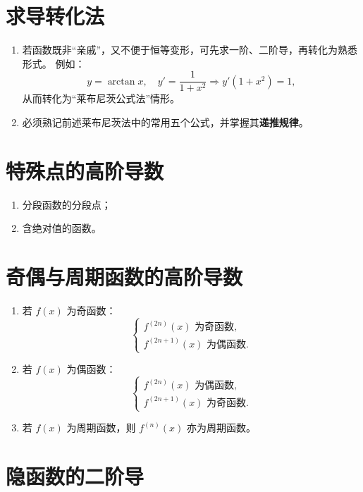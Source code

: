 \section{求导转化法}
\DTwoThree
\begin{enumerate}
    \item 若函数既非“亲戚”，又不便于恒等变形，可先求一阶、二阶导，再转化为熟悉形式。
          例如：
          \[
              y = \arctan x, \quad y' = \frac{1}{1+x^2} \Rightarrow y'(1+x^2)=1,
          \]
          从而转化为“莱布尼茨公式法”情形。

    \item 必须熟记前述莱布尼茨法中的常用五个公式，并掌握其\textbf{递推规律}。
\end{enumerate}

\section{特殊点的高阶导数}
\begin{enumerate}
    \item 分段函数的分段点；
    \item 含绝对值的函数。
\end{enumerate}


\section{奇偶与周期函数的高阶导数}

\begin{enumerate}
    \item 若 $f(x)$ 为奇函数：
          \[
              \begin{cases}
                  f^{(2n)}(x)\text{ 为奇函数}, \\
                  f^{(2n+1)}(x)\text{ 为偶函数}.
              \end{cases}
          \]
    \item 若 $f(x)$ 为偶函数：
          \[
              \begin{cases}
                  f^{(2n)}(x)\text{ 为偶函数}, \\
                  f^{(2n+1)}(x)\text{ 为奇函数}.
              \end{cases}
          \]
    \item 若 $f(x)$ 为周期函数，则 $f^{(n)}(x)$ 亦为周期函数。
\end{enumerate}


\section{隐函数的二阶导}

